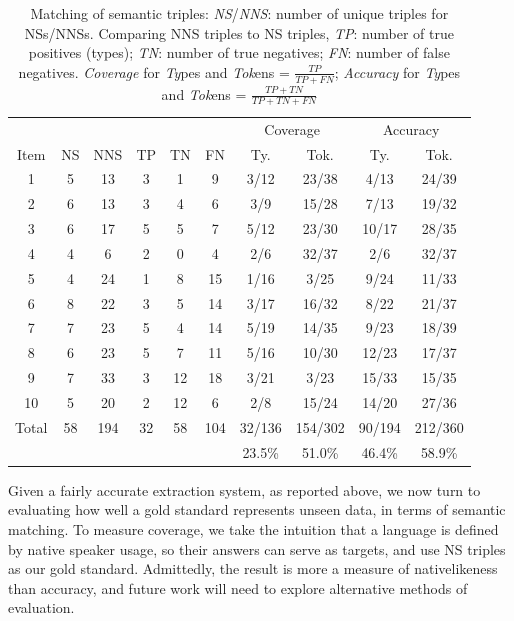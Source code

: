 \begin{table}[htb!]
\begin{center}
\begin{tabular}{|c||c|c||c|c|c||cc|cc|}
\hline
  & & & & & & \multicolumn{2}{c|}{Coverage} & \multicolumn{2}{c|}{Accuracy}\\
 Item & NS & NNS & TP & TN & FN & Ty. & Tok. & Ty. & Tok.\\
\hline
\hline
1 & 5 & 13 & 3 & 1 & 9 & 3/12 & 23/38 & 4/13 & 24/39 \\%
\hline
2 & 6 & 13 & 3 & 4 & 6 & 3/9 & 15/28 & 7/13 & 19/32 \\%
\hline
3 & 6 & 17 & 5 & 5 & 7 & 5/12 & 23/30 & 10/17 & 28/35 \\%
\hline
4 & 4 & 6 & 2 & 0 & 4 & 2/6 & 32/37 & 2/6 & 32/37 \\%
\hline
5 & 4 & 24 & 1 & 8 & 15 & 1/16 & 3/25 & 9/24 & 11/33 \\%
\hline
6 & 8 & 22 & 3 & 5 & 14 & 3/17 & 16/32 & 8/22 & 21/37 \\%
\hline
7 & 7 & 23 & 5 & 4 & 14 & 5/19 & 14/35 & 9/23 & 18/39 \\%
\hline
8 & 6 & 23 & 5 & 7 & 11 & 5/16 & 10/30 & 12/23 & 17/37 \\%
\hline
9 & 7 & 33 & 3 & 12 & 18 & 3/21 & 3/23 & 15/33 & 15/35 \\%
\hline
10 & 5 & 20 & 2 & 12 & 6 & 2/8 & 15/24 & 14/20 & 27/36 \\%
\hline
\hline
Total & 58 & 194 & 32 & 58 & 104 & 32/136 & 154/302 & 90/194 & 212/360\\%
      &    &     &    &    &     & 23.5\% & 51.0\% & 46.4\% & 58.9\%\\%
\hline
\end{tabular}
\end{center}
\caption{Matching of semantic triples: \emph{NS}/\emph{NNS}: number of
  unique triples for NSs/NNSs. Comparing NNS triples to NS triples,
  \emph{TP}: number of true positives (types); \emph{TN}: number of
  true negatives; \emph{FN}: number of false negatives.
  \emph{Coverage} for \emph{Ty}pes and \emph{Tok}ens =
  $\frac{TP}{TP+FN}$; \emph{Accuracy} for \emph{Ty}pes and
  \emph{Tok}ens = $\frac{TP+TN}{TP+TN+FN}$}

\label{tab:triple-coverage}
\end{table}

Given a fairly accurate extraction system, as reported above, we now
turn to evaluating how well a gold standard represents unseen data, in
terms of semantic matching.  To measure coverage, we take the
intuition that a language is defined by native speaker usage, so their
answers can serve as targets, and use NS triples as our gold standard. Admittedly, the result is more a measure of nativelikeness than accuracy, and future work will need to explore alternative methods of evaluation.

